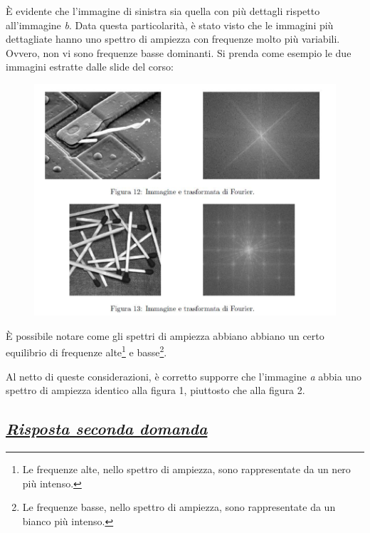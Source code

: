 \documentclass[a4paper]{article}
\begin{document}
	È evidente che l'immagine di sinistra sia quella con più dettagli rispetto all'immagine \emph{b}. Data questa particolarità, è stato visto che le immagini più dettagliate hanno uno spettro di ampiezza con frequenze molto più variabili. Ovvero, non vi sono frequenze basse dominanti. Si prenda come esempio le due immagini estratte dalle slide del corso:
	\begin{figure}[!htp]
		\centering
		\includegraphics[width=\textwidth]{img/fig_7.png}
	\end{figure}
		
	\noindent
	È possibile notare come gli spettri di ampiezza abbiano abbiano un certo equilibrio di frequenze alte\footnote{Le frequenze alte, nello spettro di ampiezza, sono rappresentate da un nero più intenso.} e basse\footnote{Le frequenze basse, nello spettro di ampiezza, sono rappresentate da un bianco più intenso.}.\newline
	
	\noindent
	Al netto di queste considerazioni, è corretto supporre che l'immagine \emph{a} abbia uno spettro di ampiezza identico alla figura 1, piuttosto che alla figura 2.\newpage
	
	\subsection*{\textcolor{Green4}{\emph{\underline{Risposta seconda domanda}}}}
	
\end{document}
